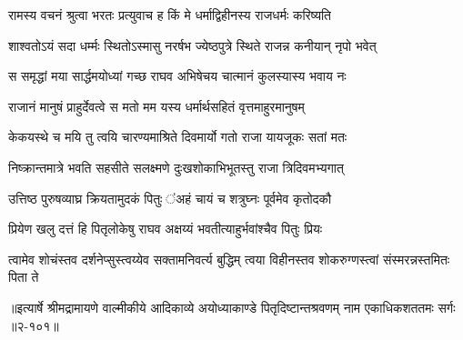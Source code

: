 
\twolineshloka
{रामस्य वचनं श्रुत्वा भरतः प्रत्युवाच ह}
{किं मे धर्माद्विहीनस्य राजधर्मः करिष्यति} %

\twolineshloka
{शाश्वतोऽयं सदा धर्म्मः स्थितोऽस्मासु नरर्षभ}
{ज्येष्ठपुत्रे स्थिते राजन्न कनीयान् नृपो भवेत्} %

\twolineshloka
{स समृद्धां मया सार्द्धमयोध्यां गच्छ राघव}
{अभिषेचय चात्मानं कुलस्यास्य भवाय नः} %

\twolineshloka
{राजानं मानुषं प्राहुर्देवत्वे स मतो मम}
{यस्य धर्मार्थसहितं वृत्तमाहुरमानुषम्} %

\twolineshloka
{केकयस्थे च मयि तु त्वयि चारण्यमाश्रिते}
{दिवमार्यो गतो राजा यायजूकः सतां मतः} %

\twolineshloka
{निष्क्रान्तमात्रे भवति सहसीते सलक्ष्मणे}
{दुःखशोकाभिभूतस्तु राजा त्रिदिवमभ्यगात्} %

\twolineshloka
{उत्तिष्ठ पुरुषव्याघ्र क्रियतामुदकं पितुः}
{ऺअहं चायं च शत्रुघ्नः पूर्वमेव कृतोदकौ} %

\twolineshloka
{प्रियेण खलु दत्तं हि पितृलोकेषु राघव}
{अक्षय्यं भवतीत्याहुर्भवांश्चैव पितुः प्रियः} %

\twolineshloka
{त्वामेव शोचंस्तव दर्शनेप्सुस्त्वय्येव सक्तामनिवर्त्य बुद्धिम्}
{त्वया विहीनस्तव शोकरुग्णस्त्वां संस्मरन्नस्तमितः पिता ते} %


॥इत्यार्षे श्रीमद्रामायणे वाल्मीकीये आदिकाव्ये अयोध्याकाण्डे पितृदिष्टान्तश्रवणम् नाम एकाधिकशततमः सर्गः ॥२-१०१॥
